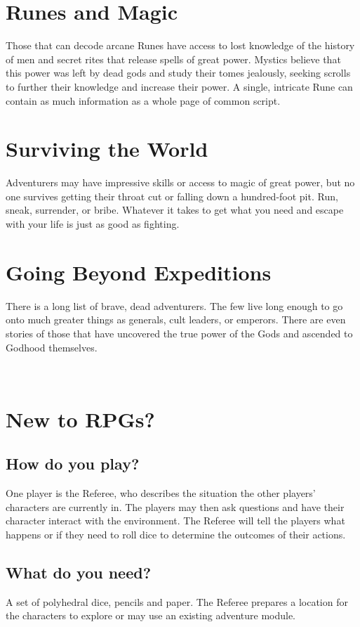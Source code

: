 \documentclass[itdr]{subfiles}
\begin{document}
\section*{Runes and Magic}

Those that can decode arcane Runes have access to lost knowledge of the history of men and secret rites that release spells of great power. Mystics believe that this power was left by dead gods and study their tomes jealously, seeking scrolls to further their knowledge and increase their power. A single, intricate Rune can contain as much information as a whole page of common script.

\vfill
\break

\section*{Surviving the World}

Adventurers may have impressive skills or access to magic of great power, but no one survives getting their throat cut or falling down a hundred-foot pit. Run, sneak, surrender, or bribe. Whatever it takes to get what you need and escape with your life is just as good as fighting.

\section*{Going Beyond Expeditions}

There is a long list of brave, dead adventurers. The few live long enough to go onto much greater things as generals, cult leaders, or emperors. There are even stories of those that have uncovered the true power of the Gods and ascended to Godhood themselves.

~\\

\section*{New to RPGs?}

\subsection*{How do you play?}
One player is the Referee, who describes the situation the other players' characters are currently in. The players may then ask questions and have their character interact with the environment. The Referee will tell the players what happens or if they need to roll dice to determine the outcomes of their actions.

\subsection*{What do you need?}
A set of polyhedral dice, pencils and paper. The Referee prepares a location for the characters to explore or may use an existing adventure module.
\end{document}
